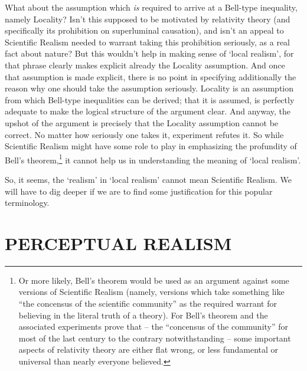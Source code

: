\documentclass[12pt]{article}
\begin{document}
What about the assumption which \emph{is} required to arrive at a
Bell-type inequality, namely Locality?  Isn't this supposed to be
motivated by relativity theory (and specifically its prohibition on
superluminal causation), and isn't an appeal to Scientific Realism
needed to warrant taking this prohibition seriously, as a real fact
about nature?  But this wouldn't help in making sense of `local
realism', for that phrase clearly makes explicit already the Locality
assumption.  And once that assumption is made explicit, there is no
point in specifying additionally the reason why one should take the
assumption seriously.  Locality is an assumption from which Bell-type
inequalities can be derived; that it is assumed, is perfectly adequate
to make the logical structure of the argument clear.  And anyway, the
upshot of the argument is precisely that the Locality assumption
cannot be correct.  No matter how seriously one takes it, experiment
refutes it.  So while Scientific Realism might have some role to play
in emphasizing the profundity of Bell's theorem,\footnote{Or more
  likely, Bell's theorem would be used as an argument against some
  versions of Scientific Realism (namely, versions which take
  something like ``the concensus of the scientific community'' as the
  required warrant for believing in the literal truth of a theory).
  For Bell's theorem and the associated experiments prove that --
  the ``concensus of the community'' for most of the last century to 
  the contrary notwithstanding --
  some important aspects of relativity theory are either flat wrong,
  or less fundamental or universal than nearly everyone believed.}
it cannot help us in understanding the meaning of `local realism'.

So, it seems, the `realism' in
`local realism' cannot mean Scientific Realism.  We will have to dig
deeper if we are to find some justification for this popular
terminology.  



\section{PERCEPTUAL REALISM}
\end{document}
